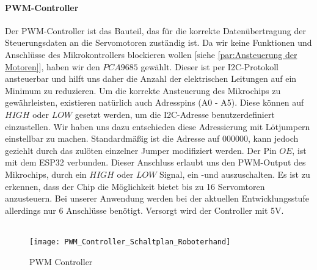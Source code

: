 \documentclass[titlepage,12pt,twoside]{article}
\begin{document}
\paragraph{PWM-Controller}
\hfill \break
\hfill \break
Der PWM-Controller ist das Bauteil, das für die korrekte Datenübertragung der Steuerungsdaten an die Servomotoren zuständig ist. Da wir keine Funktionen und Anschlüsse des Mikrokontrollers blockieren wollen [siehe \textcolor{blue}{\autoref{par:Ansteuerung der Motoren}}], 
haben wir den $PCA9685$ gewählt. Dieser ist per I2C-Protokoll ansteuerbar und hilft uns daher die Anzahl der elektrischen Leitungen auf ein Minimum zu reduzieren. Um die korrekte Ansteuerung des Mikrochips zu gewährleisten, existieren
natürlich auch Adresspins (A0 - A5). Diese können auf $HIGH$ oder $LOW$ gesetzt werden, um die I2C-Adresse benutzerdefiniert einzustellen. Wir haben uns dazu entschieden diese Adressierung mit Lötjumpern einstellbar zu machen. Standardmäßig
ist die Adresse auf $0 0 0 0 0 0$, kann jedoch geziehlt durch das zulöten einzelner Jumper modifiziert werden. Der Pin $OE$, ist mit dem ESP32 verbunden. Dieser Anschluss erlaubt uns den PWM-Output des Mikrochips, durch ein $HIGH$ oder $LOW$ 
Signal, ein -und auszuschalten. Es ist zu erkennen, dass der Chip die Möglichkeit bietet bis zu 16 Servomtoren anzusteuern. Bei unserer Anwendung werden bei der aktuellen Entwicklungsstufe allerdings nur 6 Anschlüsse benötigt. Versorgt wird
der Controller mit 5V. \\
\\
\begin{figure}[H]
	\begin{center}
		\scalebox{0.6}
		{\texttt{[image: PWM\_Controller\_Schaltplan\_Roboterhand]}}
		\caption{PWM Controller}
		\label{fig:PWM_Controller_Schaltplan_Roboterhand}		
	\end{center}
\end{figure}
\hfill \break
\end{document}
